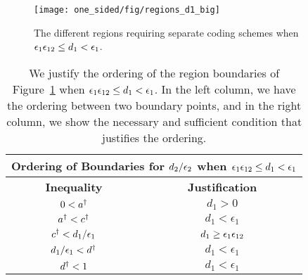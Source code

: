 \begin{figure}
	\centering
	\texttt{[image: one\_sided/fig/regions\_d1\_big]}
	\caption{The different regions requiring separate coding schemes when $\epsilon_1\epsilon_{12} \leq d_1 < \epsilon_1$.}
	\label{fig:regions_d1_big}
\end{figure}

\begin{table}
	\begin{center}
		\begin{tabular}{| c | c |}
			\hline
			\multicolumn{2}{|c|}{{\bf Ordering of Boundaries for $d_2/\epsilon_2$ when $\epsilon_1\epsilon_{12} \leq d_1 < \epsilon_1$}} \\
			\hline
			{\bf Inequality} & {\bf Justification}   \\ \hline
			$0 < a^{\dagger}$ & $d_1 > 0$ \\ \hline 
			$a^{\dagger} < c^{\dagger}$ & $d_1 < \epsilon_1$ \\ \hline 
			$c^{\dagger} < d_1/\epsilon_1$ & $d_1 \geq \epsilon_1\epsilon_{12}$ \\ \hline 
			$d_1/\epsilon_1 < d^{\dagger}$ &$d_1 < \epsilon_1$ \\ \hline 
			$d^{\dagger} < 1$ & $d_1 < \epsilon_1$ \\
			\hline
		\end{tabular}
	\end{center}
	\caption{We justify the ordering of the region boundaries of Figure~\ref{fig:regions_d1_big} when $\epsilon_1\epsilon_{12} \leq d_1 < \epsilon_1$.  In the left column, we have the ordering between two boundary points, and in the right column, we show the necessary and sufficient condition that justifies the ordering.}	
	\label{tab:d1_big}	
\end{table}